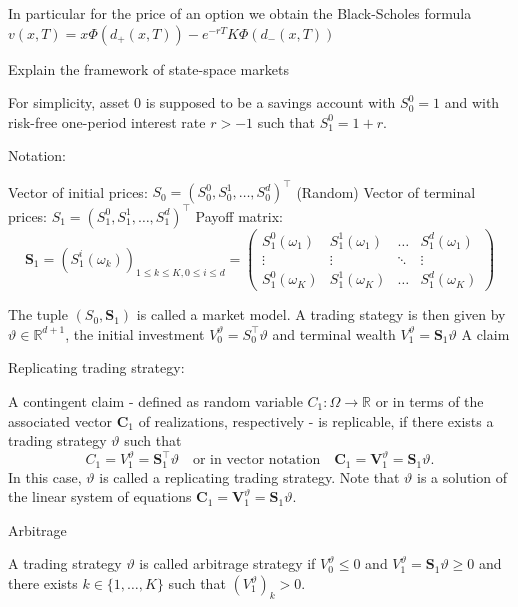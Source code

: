 In particular for the price of an option we obtain the Black-Scholes formula
\( v(x, T) = x \Phi(d_{+}(x, T)) - e^{-rT}K\Phi(d_{-}(x, T)) \)


Explain the framework of state-space markets

For simplicity, asset \( 0 \) is supposed to be a savings account with \( S_0^0 = 1 \) and with risk-free one-period interest rate \( r > -1 \) 
such that \( S_1^0 = 1 + r \).

Notation:

Vector of initial prices: \( S_0 = (S_0^0, S_0^1, \ldots, S_0^d)^\top \)
(Random) Vector of terminal prices: \( S_1 = (S_1^0, S_1^1, \ldots, S_1^d)^\top \)
Payoff matrix:
\[
\boldsymbol{S}_1 = (S_1^i(\omega_k))_{1 \leq k \leq K, 0 \leq i \leq d} = 
\begin{pmatrix}
    S_1^0(\omega_1) & S_1^1(\omega_1) & \dots & S_1^d(\omega_1) \\
    \vdots & \vdots & \ddots & \vdots \\
    S_1^0(\omega_K) & S_1^1(\omega_K) & \dots & S_1^d(\omega_K)
\end{pmatrix}
\]

The tuple \( (S_0, \boldsymbol{S}_1) \) is called a market model.
A trading stategy is then given by \( \vartheta \in \mathbb{R}^{d+1} \),
the initial investment \( V_0^{\vartheta} = S^\top_0 \vartheta \) and terminal wealth \( V_1^{\vartheta} = \boldsymbol{S}_1 \vartheta \)
A claim 

Replicating trading strategy:

A contingent claim - defined as random variable \( C_1 : \Omega \to \mathbb{R} \) or in terms of the associated vector \( \boldsymbol{C}_1 \) of 
realizations, respectively - is replicable, if there exists a trading strategy \( \vartheta \) such that
  \[
  C_1 = V_1^{\vartheta} = \boldsymbol{S}_1^\top \vartheta \quad \text{or in vector notation} \quad \boldsymbol{C}_1 = \boldsymbol{V}_1^{\vartheta} = \boldsymbol{S}_1 \vartheta.
  \]
In this case, \( \vartheta \) is called a replicating trading strategy.
Note that \( \vartheta \) is a solution of the linear system of equations 
\(\boldsymbol{C}_1 = \boldsymbol{V}_1^{\vartheta} = \boldsymbol{S}_1 \vartheta. \)

Arbitrage

A trading strategy \( \vartheta \) is called arbitrage strategy if \( V_0^{\vartheta} \leq 0 \) and 
\( V_1^{\vartheta} = \boldsymbol{S}_1 \vartheta \geq 0 \) and there exists \( k \in \{1, \ldots, K\} \) such that \((V_1^{\vartheta})_k > 0. \)

